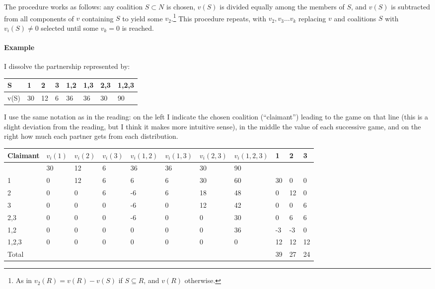 \documentclass[12pt]{article}
\begin{document}
The procedure works as follows: any coalition $S\subset N$ is chosen, $v(S)$
is divided equally among the members of $S$, and $v(S)$ is subtracted from all
components of $v$ containing $S$ to yield some $v_2$.\footnote{As in $v_2(R) =
  v(R)-v(S)$ if $S \subseteq R$, and $v(R)$ otherwise.} This procedure repeats,
with $v_2, v_3\ldots v_k$ replacing $v$ and coalitions $S$ with $v_i(S)\neq 0$
selected until some $v_k = 0$ is reached.

\paragraph{Example}
I dissolve the partnership represented by:
\begin{table}[h]
\centering
\begin{tabular}{|l|l|l|l|l|l|l|l|}
\hline
S    & 1  & 2  & 3 & 1,2 & 1,3 & 2,3 & 1,2,3 \\ \hline
v(S) & 30 & 12 & 6 & 36  & 36  & 30  & 90    \\ \hline
\end{tabular}
\end{table}

I use the same notation as in the reading: on the left I indicate the chosen
coalition (``claimant'') leading to the game on that line (this is a slight
deviation from the reading, but I think it makes more intuitive sense), in
the middle the value of each successive game,
and on the right how much each partner gets from each distribution.
\begin{table}[h]
  \scriptsize
\centering
\begin{tabular}{|l|l|l|l|l|l|l|l|l|l|l|}
\hline
Claimant & $v_i(1)$ & $v_i(2)$ & $v_i(3)$ & $v_i(1,2)$ & $v_i(1,3)$ & $v_i(2,3)$ & $v_i(1,2,3)$ & 1  & 2  & 3  \\ \hline
         & 30      & 12      & 6       & 36        & 36        & 30        & 90          &    &    &    \\ \hline
1        & 0       & 12      & 6       & 6         & 6         & 30        & 60          & 30 & 0  & 0  \\ \hline
2        & 0       & 0       & 6       & -6        & 6         & 18        & 48          & 0  & 12 & 0  \\ \hline
3        & 0       & 0       & 0       & -6        & 0         & 12        & 42          & 0  & 0  & 6  \\ \hline
2,3      & 0       & 0       & 0       & -6        & 0         & 0         & 30          & 0  & 6  & 6  \\ \hline
1,2      & 0       & 0       & 0       & 0         & 0         & 0         & 36          & -3 & -3 & 0  \\ \hline
1,2,3    & 0       & 0       & 0       & 0         & 0         & 0         & 0           & 12 & 12 & 12 \\ \hline
Total    &         &         &         &           &           &           &             & 39 & 27 & 24 \\ \hline
\end{tabular}
\end{table}
\pagebreak
\end{document}
